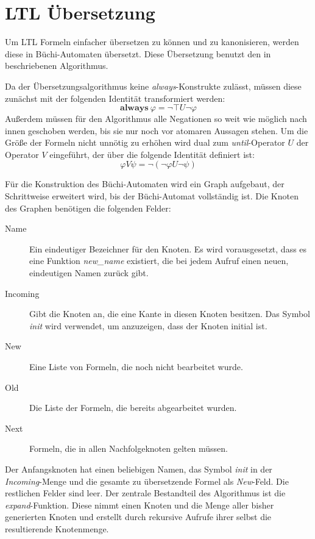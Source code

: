 \section{LTL Übersetzung}
Um LTL Formeln einfacher übersetzen zu können und zu kanonisieren, werden diese in Büchi-Automaten übersetzt.
Diese Übersetzung benutzt den in \cite{Gerth95simpleon-the-fly} beschriebenen Algorithmus.

Da der Übersetzungsalgorithmus keine \emph{always}-Konstrukte zulässt, müssen diese zunächst mit der folgenden Identität transformiert werden:
\[ \textbf{always}\ \varphi = \lnot\top U \lnot\varphi \]
Außerdem müssen für den Algorithmus alle Negationen so weit wie möglich nach innen geschoben werden, bis sie nur noch vor atomaren Aussagen stehen.
Um die Größe der Formeln nicht unnötig zu erhöhen wird dual zum \emph{until}-Operator $U$ der Operator $V$ eingeführt, der über die folgende Identität definiert ist:
\[ \varphi V\psi = \lnot (\lnot\varphi U\lnot\psi) \]

Für die Konstruktion des Büchi-Automaten wird ein Graph aufgebaut, der Schrittweise erweitert wird, bis der Büchi-Automat vollständig ist.
Die Knoten des Graphen benötigen die folgenden Felder:
\begin{description}
\item[Name] Ein eindeutiger Bezeichner für den Knoten.
  Es wird vorausgesetzt, dass es eine Funktion \emph{new\_name} existiert, die bei jedem Aufruf einen neuen, eindeutigen Namen zurück gibt.
\item[Incoming] Gibt die Knoten an, die eine Kante in diesen Knoten besitzen.
  Das Symbol \emph{init} wird verwendet, um anzuzeigen, dass der Knoten initial ist.
\item[New] Eine Liste von Formeln, die noch nicht bearbeitet wurde.
\item[Old] Die Liste der Formeln, die bereits abgearbeitet wurden.
\item[Next] Formeln, die in allen Nachfolgeknoten gelten müssen.
\end{description}
Der Anfangsknoten hat einen beliebigen Namen, das Symbol \emph{init} in der \emph{Incoming}-Menge und die gesamte zu übersetzende Formel als \emph{New}-Feld.
Die restlichen Felder sind leer.
Der zentrale Bestandteil des Algorithmus ist die \emph{expand}-Funktion.
Diese nimmt einen Knoten und die Menge aller bisher generierten Knoten und erstellt durch rekursive Aufrufe ihrer selbst die resultierende Knotenmenge.

